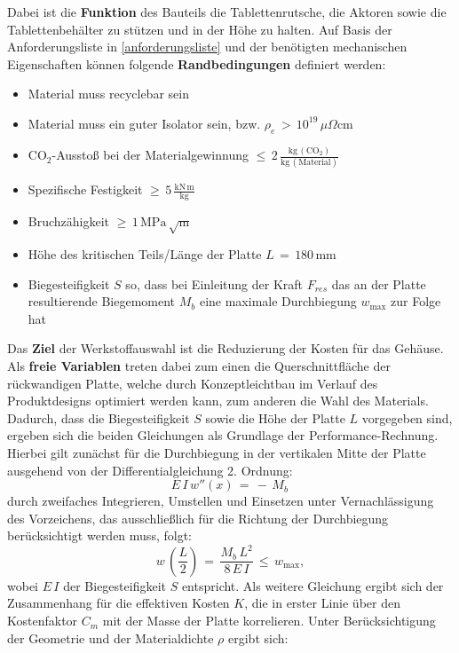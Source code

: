 Dabei ist die \textbf{Funktion} des Bauteils die Tablettenrutsche, die Aktoren sowie die Tablettenbehälter zu stützen und in der Höhe zu halten. Auf Basis der Anforderungsliste in \ref{anforderungsliste} und der benötigten mechanischen Eigenschaften können folgende \textbf{Randbedingungen} definiert werden:
\begin{itemize}
	\item Material muss recyclebar sein
	\item Material muss ein guter Isolator sein, bzw. $\rho_e\,>\,10^{19}\,\mu\Omega$cm
	\item CO$_2$-Ausstoß bei der Materialgewinnung $\le\,2\,\frac{\text{kg}\,(\text{CO}_2)}{\text{kg}\,(\text{Material})}$
	\item Spezifische Festigkeit $\ge\,5\,\frac{\text{kN}\,\text{m}}{\text{kg}}$
	\item Bruchzähigkeit $\ge\,1\,\text{MPa}\,\sqrt{\text{m}}$
	\item Höhe des kritischen Teils/Länge der Platte $L\,=\,180\,$mm
	\item Biegesteifigkeit $S$ so, dass bei Einleitung der Kraft $F_{res}$ das an der Platte resultierende Biegemoment $M_b$ eine maximale Durchbiegung $w_{\text{max}}$ zur Folge hat
\end{itemize}
Das \textbf{Ziel} der Werkstoffauswahl ist die Reduzierung der Kosten für das Gehäuse. Als \textbf{freie Variablen} treten dabei zum einen die Querschnittfläche der rückwandigen Platte, welche durch Konzeptleichtbau im Verlauf des Produktdesigns optimiert werden kann, zum anderen die Wahl des Materials.
Dadurch, dass die Biegesteifigkeit $S$ sowie die Höhe der Platte $L$ vorgegeben sind, ergeben sich die beiden Gleichungen als Grundlage der Performance-Rechnung. Hierbei gilt zunächst für die Durchbiegung in der vertikalen Mitte der Platte ausgehend von der Differentialgleichung 2. Ordnung:
\begin{equation}
	E\,I\,w''(x)\,=\,-\,M_b\,
\end{equation}
durch zweifaches Integrieren, Umstellen und Einsetzen unter Vernachlässigung des Vorzeichens, das ausschließlich für die Richtung der Durchbiegung berücksichtigt werden muss, folgt:
\begin{equation} \label{durchbiegung}
	w\,\left(\frac{L}{2}\right)\,=\,\frac{M_b \,L^2}{8\,E\,I}\,\le\,w_{\text{max}},
\end{equation}
wobei $E\,I$ der Biegesteifigkeit $S$ entspricht. Als weitere Gleichung ergibt sich der Zusammenhang für die effektiven Kosten $K$, die in erster Linie über den Kostenfaktor $C_m$ mit der Masse der Platte korrelieren. Unter Berücksichtigung der Geometrie und der Materialdichte $\rho$ ergibt sich:
